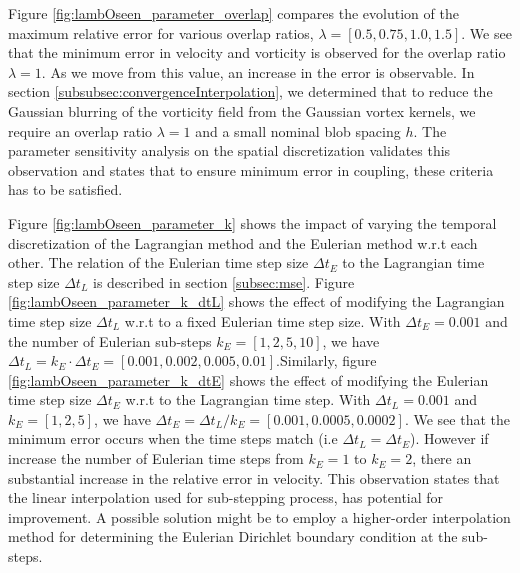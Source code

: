 Figure \ref{fig:lambOseen_parameter_overlap} compares the evolution of the maximum relative error for various overlap ratios, $\lambda = [0.5, 0.75, 1.0, 1.5]$. We see that the minimum error in velocity and vorticity is observed for the overlap ratio $\lambda = 1$. As we move from this value, an increase in the error is observable. In section \ref{subsubsec:convergenceInterpolation}, we determined that to reduce the Gaussian blurring of the vorticity field from the Gaussian vortex kernels, we require an overlap ratio $\lambda=1$ and a small nominal blob spacing $h$. The parameter sensitivity analysis on the spatial discretization validates this observation and states that to ensure minimum error in coupling, these criteria has to be satisfied.

Figure \ref{fig:lambOseen_parameter_k} shows the impact of varying the temporal discretization of the Lagrangian method and the Eulerian method w.r.t each other. The relation of the Eulerian time step size $\Delta t_E$ to the Lagrangian time step size $\Delta t_L$ is described in section \ref{subsec:mse}. Figure \ref{fig:lambOseen_parameter_k_dtL} shows the effect of modifying the Lagrangian time step size $\Delta t_L$ w.r.t to a fixed Eulerian time step size. With $\Delta t_E=0.001$ and the number of Eulerian sub-steps $k_E = [1,2,5,10]$, we have $\Delta t_L = k_E\cdot\Delta t_E = [0.001,0.002,0.005,0.01]$.Similarly, figure \ref{fig:lambOseen_parameter_k_dtE} shows the effect of modifying the Eulerian time step size $\Delta t_E$ w.r.t to the Lagrangian time step. With $\Delta t_L=0.001$ and $k_E = [1,2,5]$, we have $\Delta t_E = \Delta t_L/k_E = [0.001,0.0005,0.0002]$. We see that the minimum error occurs when the time steps match (i.e $\Delta t_L = \Delta t_E$). However if increase the number of Eulerian time steps from $k_E = 1 $ to $k_E=2$, there an substantial increase in the relative error in velocity. This observation states that the linear interpolation used for sub-stepping process, has potential for improvement. A possible solution might be to employ a higher-order interpolation method for determining the Eulerian Dirichlet boundary condition at the sub-steps.

%

